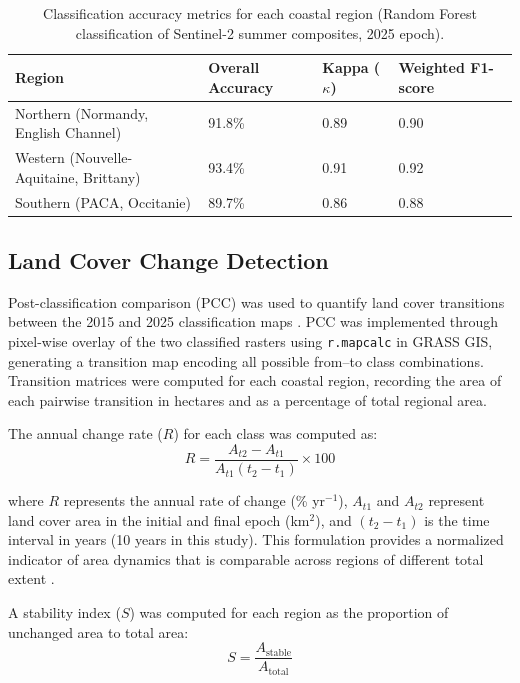 \documentclass[remotesensing,article,submit,pdftex,moreauthors]{Definitions/mdpi}
\begin{document}
\begin{table}[H]
\caption{Classification accuracy metrics for each coastal region (Random Forest classification of Sentinel-2 summer composites, 2025 epoch).}
\centering
\begin{tabular}{p{6.5cm}p{1.5cm}p{1.5cm}p{1.5cm}}
\toprule
\textbf{Region} & \textbf{Overall Accuracy} & \textbf{Kappa ($\kappa$)} & \textbf{Weighted F1-score} \\
\midrule
Northern (Normandy, English Channel) & 91.8\% & 0.89 & 0.90 \\
Western (Nouvelle-Aquitaine, Brittany) & 93.4\% & 0.91 & 0.92 \\
Southern (PACA, Occitanie) & 89.7\% & 0.86 & 0.88 \\
\bottomrule
\end{tabular}
\label{tab:accuracy}
\end{table}

\subsection{Land Cover Change Detection}

Post-classification comparison (PCC) was used to quantify land cover transitions between the 2015 and 2025 classification maps \citep{Liu2023, Gatis2022}. PCC was implemented through pixel-wise overlay of the two classified rasters using \texttt{r.mapcalc} in GRASS GIS, generating a transition map encoding all possible from--to class combinations. Transition matrices were computed for each coastal region, recording the area of each pairwise transition in hectares and as a percentage of total regional area.

The annual change rate ($R$) for each class was computed as:
\begin{equation}
R = \frac{A_{t2}-A_{t1}}{A_{t1}(t_2-t_1)} \times 100
\end{equation}

where $R$ represents the annual rate of change (\% yr$^{-1}$), $A_{t1}$ and $A_{t2}$ represent land cover area in the initial and final epoch (km$^2$), and $(t_2 - t_1)$ is the time interval in years (10 years in this study). This formulation provides a normalized indicator of area dynamics that is comparable across regions of different total extent \citep{Liu2023, earth5030024}.

A stability index ($S$) was computed for each region as the proportion of unchanged area to total area:
\begin{equation}
S = \frac{A_{\text{stable}}}{A_{\text{total}}}
\end{equation}
\end{document}
